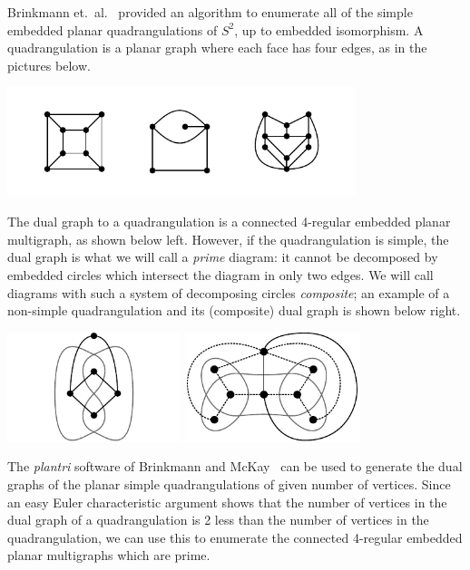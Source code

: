 \documentclass[amsmath,secnumarabic,floatfix,amssymb,nofootinbib,nobibnotes,letterpaper,11pt,tightenlines,showkeys]{revtex4}
\theoremstyle{definition}
\newcommand{\plantri}{\textit{plantri} }
\begin{document}
Brinkmann et.\ al.~\cite{Brinkmann:2007up} provided an algorithm to enumerate all of the simple embedded planar quadrangulations of $S^2$, up to embedded isomorphism. A quadrangulation is a planar graph where each face has four edges, as in the pictures below.
\begin{center}
\includegraphics[width=4in]{quadrangulations-example.pdf}
\end{center}
The dual graph to a quadrangulation is a connected 4-regular embedded planar multigraph, as shown below left. However, if the quadrangulation is simple, the dual graph is what we will call a \emph{prime} diagram: it cannot be decomposed by embedded circles which intersect the diagram in only two edges. We will call diagrams with such a system of decomposing circles \emph{composite}; an example of a non-simple quadrangulation and its (composite) dual graph is shown below right.
\begin{center}
\hphantom{.}
\hfill
\includegraphics[height=1.25in]{quadrangulation} \hfill
\includegraphics[height=1.25in]{non-simple-quadrangulation}
\hfill
\hphantom{.}
\end{center}
The \plantri software of Brinkmann and McKay~\cite{Brinkmann:2007up,McKay:1998wa} can be used to generate the dual graphs of the planar simple quadrangulations of given number of vertices. Since an easy Euler characteristic argument shows that the number of vertices in the dual graph of a quadrangulation is 2 less than the number of vertices in the quadrangulation, we can use this to enumerate the connected 4-regular embedded planar multigraphs which are prime.
\end{document}
